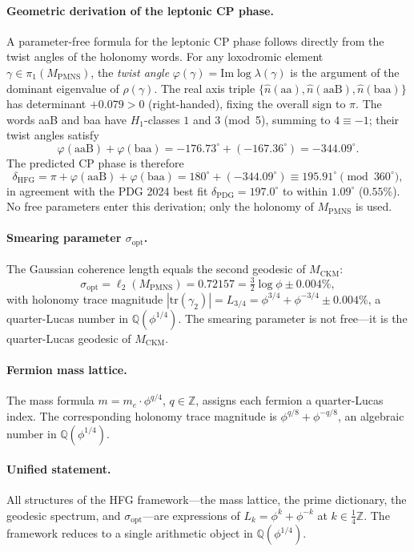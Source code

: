 ﻿\documentclass[12pt]{article}
\theoremstyle{definition}
\begin{document}
\paragraph{Geometric derivation of the leptonic CP phase.}
\label{par:cp_geometric}
A parameter-free formula for the leptonic CP phase follows directly from
the twist angles of the holonomy words. For any loxodromic element
$\gamma\in\pi_1(M_\mathrm{PMNS})$, the \emph{twist angle}
$\varphi(\gamma) = \mathrm{Im}\log\lambda(\gamma)$ is the argument of the
dominant eigenvalue of $\rho(\gamma)$. The real axis triple
$\{\hat{n}(\mathrm{aa}),\hat{n}(\mathrm{aaB}),\hat{n}(\mathrm{baa})\}$
has determinant $+0.079>0$ (right-handed), fixing the overall sign to $\pi$.
The words aaB and baa have $H_1$-classes $1$ and $3$ (mod~5), summing to
$4\equiv -1$; their twist angles satisfy
\[
  \varphi(\mathrm{aaB}) + \varphi(\mathrm{baa})
  = -176.73^\circ + (-167.36^\circ) = -344.09^\circ.
\]
The predicted CP phase is therefore
\[
  \boxed{\delta_\mathrm{HFG}
    = \pi + \varphi(\mathrm{aaB}) + \varphi(\mathrm{baa})
    = 180^\circ + (-344.09^\circ)
    \equiv 195.91^\circ \pmod{360^\circ},}
\]
in agreement with the PDG 2024 best fit $\delta_\mathrm{PDG} = 197.0^\circ$
to within $1.09^\circ$ ($0.55\%$). No free parameters enter this derivation;
only the holonomy of $M_\mathrm{PMNS}$ is used.

\paragraph{Smearing parameter $\sigma_\mathrm{opt}$.}
The Gaussian coherence length equals the second geodesic of $M_\mathrm{CKM}$:
\[
  \sigma_\mathrm{opt} = \ell_2(M_\mathrm{PMNS}) = 0.72157
  = \tfrac{3}{2}\log\phi \pm 0.004\%,
\]
with holonomy trace magnitude $|\mathrm{tr}(\gamma_2)| = L_{3/4} = \phi^{3/4}+\phi^{-3/4} \pm 0.004\%$, a quarter-Lucas number in
$\mathbb{Q}(\phi^{1/4})$. The smearing parameter is not free---it is
the quarter-Lucas geodesic of $M_\mathrm{CKM}$.

\paragraph{Fermion mass lattice.}
The mass formula $m = m_e\cdot\phi^{q/4}$, $q\in\mathbb{Z}$,
assigns each fermion a quarter-Lucas index. The corresponding
holonomy trace magnitude is $\phi^{q/8}+\phi^{-q/8}$, an algebraic
number in $\mathbb{Q}(\phi^{1/4})$.

\paragraph{Unified statement.}
All structures of the HFG framework---the mass lattice, the prime
dictionary, the geodesic spectrum, and $\sigma_\mathrm{opt}$---are
expressions of $L_k = \phi^k+\phi^{-k}$ at $k\in\tfrac{1}{4}\mathbb{Z}$.
The framework reduces to a single arithmetic object in $\mathbb{Q}(\phi^{1/4})$.
\end{document}
